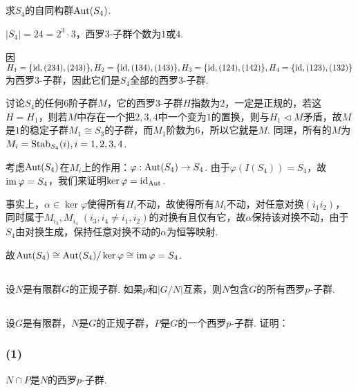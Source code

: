 \subsection{}
求$S_4$的自同构群$\operatorname{Aut}(S_4)$.

\jie
$|S_4|=24=2^3\cdot 3$，西罗$3$-子群个数为$1$或$4$.

因$H_1=\{\operatorname{id},(234),(243)\}, H_2=\{\operatorname{id},(134),(143)\}, H_3=\{\operatorname{id},(124),(142)\}, H_4=\{\operatorname{id},(123),(132)\}$为西罗$3$-子群，因此它们是$S_4$全部的西罗$3$-子群.

讨论$S_4$的任何$6$阶子群$M$，它的西罗$3$-子群$H$指数为$2$，一定是正规的，若这$H=H_1$，则若$M$中存在一个把$2,3,4$中一个变为$1$的置换，则与$H_1\vartriangleleft M$矛盾，故$M$是$1$的稳定子群$M_1\cong S_3$的子群，而$M_1$阶数为$6$，所以它就是$M$. 同理，所有的$M$为$M_i=\operatorname{Stab}_{S_4}(i), i=1,2,3,4$. 

考虑$\operatorname{Aut}(S_4)$在$M_i$上的作用：$\varphi:\operatorname{Aut}(S_4)\rightarrow S_4$. 由于$\varphi(I(S_4))=S_4$，故$\operatorname{im}\varphi=S_4$，我们来证明$\ker\varphi=\operatorname{id}_{\operatorname{Aut}}$.

事实上，$\alpha\in\ker\varphi$使得所有$H_i$不动，故使得所有$M_i$不动，对任意对换$(i_1i_2)$，同时属于$M_{i_3},M_{i_4}\;(i_3, i_4\neq i_1,i_2)$的对换有且仅有它，故$\alpha$保持该对换不动，由于$S_4$由对换生成，保持任意对换不动的$\alpha$为恒等映射.

故$\operatorname{Aut}(S_4)\cong\operatorname{Aut}(S_4)/\ker\varphi\cong\operatorname{im}\varphi=S_4$.

\subsection{}
设$N$是有限群$G$的正规子群. 如果$p$和$|G/N|$互素，则$N$包含$G$的所有西罗$p$-子群.


\subsection{}
设$G$是有限群，$N$是$G$的正规子群，$P$是$G$的一个西罗$p$-子群. 证明：

\subsubsection{(1)}
$N\cap P$是$N$的西罗$p$-子群.

